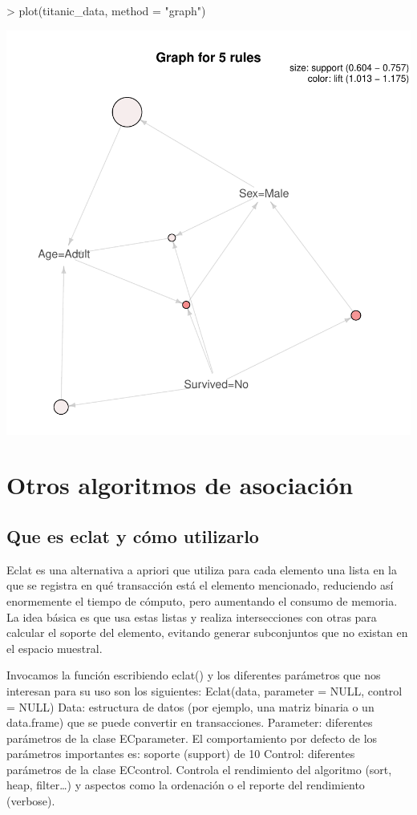 \documentclass [a4paper] {article}
\begin{document}
\begin{center}
\begin{Schunk}
\begin{Sinput}
> plot(titanic_data, method = "graph")
\end{Sinput}
\end{Schunk}
\includegraphics{entrega-grafica_apriori_titanic_data_graph}
\end{center}

\newpage
\section{Otros algoritmos de asociación}

\subsection{Que es eclat y cómo utilizarlo}
Eclat es una alternativa a apriori que utiliza para cada elemento una lista en la que se registra en qué transacción está el 
elemento mencionado, reduciendo así enormemente el tiempo de cómputo, pero aumentando el consumo de memoria. La idea básica 
es que usa estas listas y realiza intersecciones con otras para calcular el soporte del elemento, evitando generar subconjuntos 
que no existan en el espacio muestral.

Invocamos la función escribiendo eclat() y los diferentes parámetros que nos interesan para su uso son los siguientes:
Eclat(data, parameter = NULL,  control = NULL)
Data: estructura de datos (por ejemplo, una matriz binaria o un data.frame) que se puede convertir en transacciones.
Parameter: diferentes parámetros de la clase ECparameter. El comportamiento por defecto de los parámetros importantes es: soporte (support) de 10%
Control: diferentes parámetros de la clase ECcontrol. Controla el rendimiento del algoritmo (sort, heap, filter…) y aspectos como la ordenación o el reporte del rendimiento (verbose).
\end{document}

